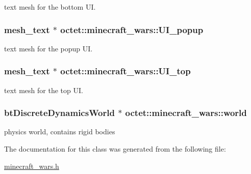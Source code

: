 text mesh for the bottom U\+I. 

\hypertarget{classoctet_1_1minecraft__wars_a3afa44a220796b1132b02c6ceb405fb1}{
\subsubsection[{U\+I\+\_\+popup}]{\setlength{\rightskip}{0pt plus 5cm}mesh\+\_\+text $\ast$ octet\+::minecraft\+\_\+wars\+::\+U\+I\+\_\+popup\hspace{0.3cm}{\ttfamily [private]}}}\label{classoctet_1_1minecraft__wars_a3afa44a220796b1132b02c6ceb405fb1}


text mesh for the popup U\+I. 

\hypertarget{classoctet_1_1minecraft__wars_aef4ef24e39d99f8c85f89869deebfd71}{
\subsubsection[{U\+I\+\_\+top}]{\setlength{\rightskip}{0pt plus 5cm}mesh\+\_\+text $\ast$ octet\+::minecraft\+\_\+wars\+::\+U\+I\+\_\+top\hspace{0.3cm}{\ttfamily [private]}}}\label{classoctet_1_1minecraft__wars_aef4ef24e39d99f8c85f89869deebfd71}


text mesh for the top U\+I. 

\hypertarget{classoctet_1_1minecraft__wars_ad609d762782c6f823aec20fc26dfae00}{
\subsubsection[{world}]{\setlength{\rightskip}{0pt plus 5cm}bt\+Discrete\+Dynamics\+World $\ast$ octet\+::minecraft\+\_\+wars\+::world\hspace{0.3cm}{\ttfamily [private]}}}\label{classoctet_1_1minecraft__wars_ad609d762782c6f823aec20fc26dfae00}


physics world, contains rigid bodies 



The documentation for this class was generated from the following file\+:\begin{DoxyCompactItemize}
\item 
\hyperlink{minecraft__wars_8h}{minecraft\+\_\+wars.\+h}\end{DoxyCompactItemize}

